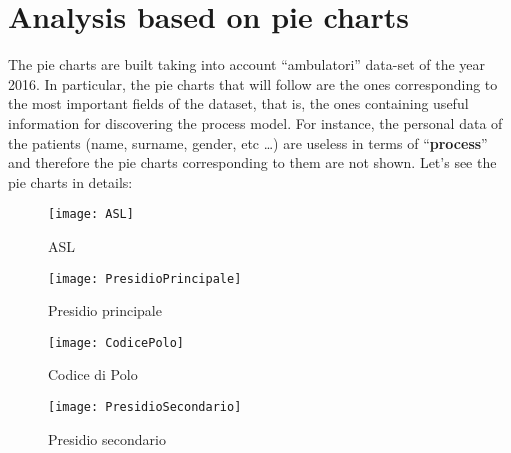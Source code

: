 \documentclass[paper=a4, fontsize=11pt]{scrartcl} %
\numberwithin{equation}{section} %
\numberwithin{figure}{section} %
\numberwithin{table}{section} %
\begin{document}
\section{Analysis based on pie charts}\label{piecharts}
The pie charts are built taking into account ``ambulatori'' data-set of the year 2016. In particular, the pie charts that will follow are the ones corresponding to the most important fields of the dataset, that is, the ones containing useful information for discovering the process model. For instance, the personal data of the patients (name, surname, gender, etc \ldots) are useless in terms of ``\textbf{process}'' and therefore the pie charts corresponding to them are not shown. Let's see the pie charts in details: \newline
\begin{figure} [htbp]
\begin{minipage}[t]{0.5\textwidth}
\centering
\texttt{[image: ASL]}
\caption{ASL}\label{asl}
\end{minipage}
\begin{minipage}[t]{0.5\textwidth}
\centering
\texttt{[image: PresidioPrincipale]}
\caption{Presidio principale}\label{presidioprincipale}
\end{minipage}
\begin{minipage}[t]{0.5\textwidth}
\centering
\texttt{[image: CodicePolo]}
\caption{Codice di Polo}\label{codicepolo}
\end{minipage}
\begin{minipage}[t]{0.5\textwidth}
\centering
\texttt{[image: PresidioSecondario]}
\caption{Presidio secondario}\label{presidiosecondario}
\end{minipage}
\end{figure}
\end{document}
